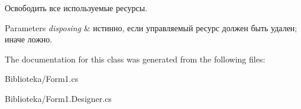 Освободить все используемые ресурсы. 


\begin{DoxyParams}{Parameters}
{\em disposing} & истинно, если управляемый ресурс должен быть удален; иначе ложно.\\
\hline
\end{DoxyParams}


The documentation for this class was generated from the following files\+:\begin{DoxyCompactItemize}
\item 
Biblioteka/Form1.\+cs\item 
Biblioteka/Form1.\+Designer.\+cs\end{DoxyCompactItemize}
